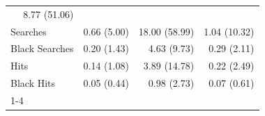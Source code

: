 \begin{table}[!h]
\begin{tabular}{llll}
  \multicolumn{1}{r}{8.77 (51.06)} \\
\multicolumn{1}{l}{\hspace{1em}Searches} &
  \multicolumn{1}{r}{0.66 (5.00)} &
  \multicolumn{1}{r}{18.00 (58.99)} &
  \multicolumn{1}{r}{1.04 (10.32)} \\
\multicolumn{1}{l}{\hspace{1em}Black Searches} &
  \multicolumn{1}{r}{0.20 (1.43)} &
  \multicolumn{1}{r}{4.63 (9.73)} &
  \multicolumn{1}{r}{0.29 (2.11)} \\
\multicolumn{1}{l}{\hspace{1em}Hits} &
  \multicolumn{1}{r}{0.14 (1.08)} &
  \multicolumn{1}{r}{3.89 (14.78)} &
  \multicolumn{1}{r}{0.22 (2.49)} \\
\multicolumn{1}{l}{\hspace{1em}Black Hits} &
  \multicolumn{1}{r}{0.05 (0.44)} &
  \multicolumn{1}{r}{0.98 (2.73)} &
  \multicolumn{1}{r}{0.07 (0.61)} \\
\cline{1-4}
\end{tabular}
\end{table}
